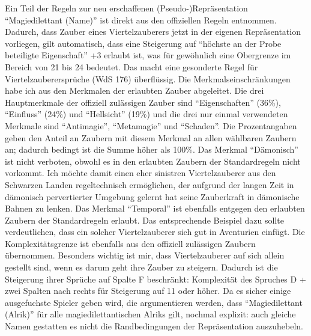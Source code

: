 Ein Teil der Regeln zur neu erschaffenen (Pseudo-)Repräsentation \enquote{Magiedilettant (Name)} ist direkt aus den offiziellen Regeln entnommen. Dadurch, dass Zauber eines Viertelzauberers jetzt in der eigenen Repräsentation vorliegen, gilt automatisch, dass eine Steigerung auf \enquote{höchste an der Probe beteiligte Eigenschaft} +3 erlaubt ist, was für gewöhnlich eine Obergrenze im Bereich von 21 bis 24 bedeutet. Das macht eine gesonderte Regel für Viertelzauberersprüche (WdS 176) überflüssig. Die Merkmalseinschränkungen habe ich aus den Merkmalen der erlaubten Zauber abgeleitet. Die drei Hauptmerkmale der offiziell zulässigen Zauber sind \enquote{Eigenschaften} (36\%), \enquote{Einfluss} (24\%) und \enquote{Hellsicht} (19\%) und die drei nur einmal verwendeten Merkmale sind \enquote{Antimagie}, \enquote{Metamagie} und \enquote{Schaden}. Die Prozentangaben geben den Anteil an Zaubern mit diesem Merkmal an allen wählbaren Zaubern an; dadurch bedingt ist die Summe höher als 100\%. Das Merkmal \enquote{Dämonisch} ist nicht verboten, obwohl es in den erlaubten Zaubern der Standardregeln nicht vorkommt. Ich möchte damit einen eher sinistren Viertelzauberer aus den Schwarzen Landen regeltechnisch ermöglichen, der aufgrund der langen Zeit in dämonisch pervertierter Umgebung gelernt hat seine Zauberkraft in dämonische Bahnen zu lenken. Das Merkmal \enquote{Temporal} ist ebenfalls entgegen den erlaubten Zaubern der Standardregeln erlaubt. Das entsprechende Beispiel dazu sollte verdeutlichen, dass ein solcher Viertelzauberer sich gut in Aventurien einfügt. Die Komplexitätsgrenze ist ebenfalls aus den offiziell zulässigen Zaubern übernommen. Besonders wichtig ist mir, dass Viertelzauberer auf sich allein gestellt sind, wenn es darum geht ihre Zauber zu steigern. Dadurch ist die Steigerung ihrer Sprüche auf Spalte F beschränkt: Komplexität des Spruches D + zwei Spalten nach rechts für Steigerung auf 11 oder höher. Da es sicher einige ausgefuchste Spieler geben wird, die argumentieren werden, dass \enquote{Magiedilettant (Alrik)} für alle magiedilettantischen Alriks gilt, nochmal explizit: auch gleiche Namen gestatten es nicht die Randbedingungen der Repräsentation auszuhebeln.

